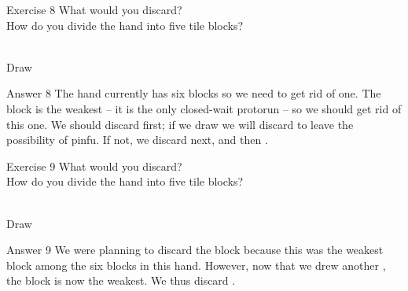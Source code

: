 \bigskip

\begin{itembox}[l]{Exercise 8}
What would you discard? \\
\vsp
How do you divide the hand into five tile blocks?

\bp
{}~\\
\hfill\footnotesize{Draw~~~~~~~~~~~}
\ep
\end{itembox}

\newpage

\begin{itembox}[r]{Answer 8}
\emj
The hand currently has six blocks so we need to get rid of one. The {\LARGE{}} block is the weakest -- it is the only closed-wait protorun -- so we should get rid of this one. We should discard {\LARGE{}} first; if we draw {\LARGE{}} we will discard {\LARGE{}} to leave the possibility of {\jap pinfu}. If not, we discard {\LARGE{}} next, and then  {\LARGE{}}.
\end{itembox}

\vfill

\begin{itembox}[l]{Exercise 9}
What would you discard? \\
\vsp
How do you divide the hand into five tile blocks?

\bp
{}\bai\bai~\\
\hfill\footnotesize{Draw~~~~~~~~~~~}
\ep
\end{itembox}

\newpage

\begin{itembox}[r]{Answer 9}
\emj
We were planning to discard the {\LARGE{}} block because this was the weakest block among the six blocks in this hand. However, now that we drew another {\LARGE{}}, the {\LARGE{}} block is now the weakest. We thus discard {\LARGE{}}.
\end{itembox}

